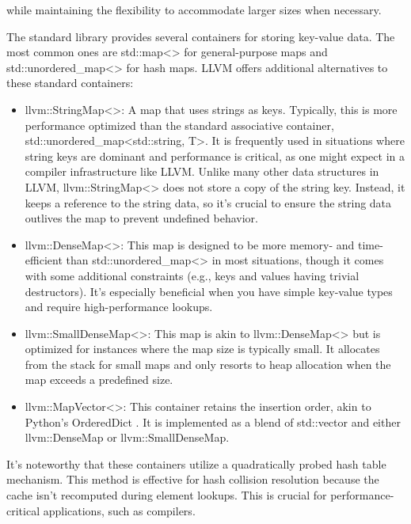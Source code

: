 while maintaining the flexibility to accommodate larger sizes when necessary.


The standard library provides several containers for storing key-value data. The most common ones are std::map<> for general-purpose maps and std::unordered\_map<> for hash maps. LLVM offers additional alternatives to these standard containers:

\begin{itemize}
\item
llvm::StringMap<>: A map that uses strings as keys. Typically, this is more performance optimized than the standard associative container, std::unordered\_map<std::string, T>. It is frequently used in situations where string keys are dominant and performance is critical, as one might expect in a compiler infrastructure like LLVM. Unlike many other data structures in LLVM, llvm::StringMap<> does not store a copy of the string key. Instead, it keeps a reference to the string data, so it’s crucial to ensure the string data outlives the map to prevent undefined behavior.

\item
llvm::DenseMap<>: This map is designed to be more memory- and time-efficient than std::unordered\_map<> in most situations, though it comes with some additional constraints (e.g., keys and values having trivial destructors). It’s especially beneficial when you have simple key-value types and require high-performance lookups.

\item
llvm::SmallDenseMap<>: This map is akin to llvm::DenseMap<> but is optimized for instances where the map size is typically small. It allocates from the stack for small maps and only resorts to heap allocation when the map exceeds a predefined size.

\item
llvm::MapVector<>: This container retains the insertion order, akin to Python’s OrderedDict . It is implemented as a blend of std::vector and either llvm::DenseMap or llvm::SmallDenseMap.
\end{itemize}

It’s noteworthy that these containers utilize a quadratically probed hash table mechanism. This method is effective for hash collision resolution because the cache isn’t recomputed during element lookups. This is crucial for performance-critical applications, such as compilers.


